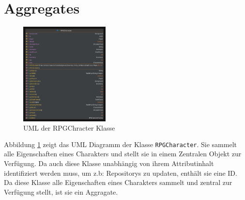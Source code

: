 \section{Aggregates}
\begin{figure}[H]
	\centering
	\includegraphics[width=0.4\textwidth]{Bilder/RPGCharacter.pdf}
	\caption{UML der RPGChracter Klasse}
	\label{fig:Aggregate}
\end{figure}
Abbildung \ref{fig:Aggregate} zeigt das UML Diagramm der Klasse \texttt{RPGCharacter}. Sie sammelt alle Eigenschaften eines Charakters und stellt sie in einem Zentralen Objekt zur Verfügung. Da auch diese Klasse unabhängig von ihrem Attributinhalt identifiziert werden muss, um z.b: Repositorys zu updaten, enthält sie eine ID. Da diese Klasse alle Eigenschaften eines Charakters sammelt und zentral zur Verfügung stellt, ist sie ein Aggragate.